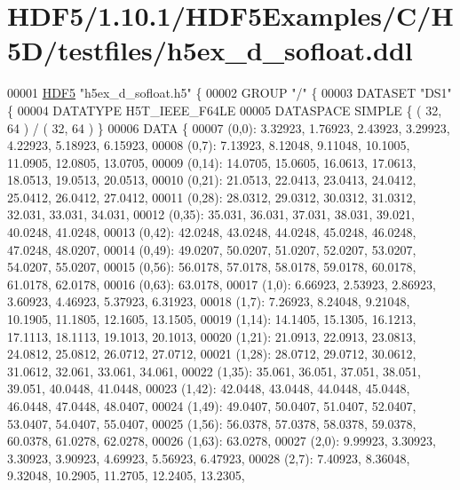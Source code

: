 \hypertarget{_h_d_f5_21_810_81_2_h_d_f5_examples_2_c_2_h5_d_2testfiles_2h5ex__d__sofloat_8ddl_source}{}\section{H\+D\+F5/1.10.1/\+H\+D\+F5\+Examples/\+C/\+H5\+D/testfiles/h5ex\+\_\+d\+\_\+sofloat.ddl}
\label{_h_d_f5_21_810_81_2_h_d_f5_examples_2_c_2_h5_d_2testfiles_2h5ex__d__sofloat_8ddl_source}

\begin{DoxyCode}
00001 \hyperlink{namespace_h_d_f5}{HDF5} \textcolor{stringliteral}{"h5ex\_d\_sofloat.h5"} \{
00002 GROUP \textcolor{stringliteral}{"/"} \{
00003    DATASET \textcolor{stringliteral}{"DS1"} \{
00004       DATATYPE  H5T\_IEEE\_F64LE
00005       DATASPACE  SIMPLE \{ ( 32, 64 ) / ( 32, 64 ) \}
00006       DATA \{
00007       (0,0): 3.32923, 1.76923, 2.43923, 3.29923, 4.22923, 5.18923, 6.15923,
00008       (0,7): 7.13923, 8.12048, 9.11048, 10.1005, 11.0905, 12.0805, 13.0705,
00009       (0,14): 14.0705, 15.0605, 16.0613, 17.0613, 18.0513, 19.0513, 20.0513,
00010       (0,21): 21.0513, 22.0413, 23.0413, 24.0412, 25.0412, 26.0412, 27.0412,
00011       (0,28): 28.0312, 29.0312, 30.0312, 31.0312, 32.031, 33.031, 34.031,
00012       (0,35): 35.031, 36.031, 37.031, 38.031, 39.021, 40.0248, 41.0248,
00013       (0,42): 42.0248, 43.0248, 44.0248, 45.0248, 46.0248, 47.0248, 48.0207,
00014       (0,49): 49.0207, 50.0207, 51.0207, 52.0207, 53.0207, 54.0207, 55.0207,
00015       (0,56): 56.0178, 57.0178, 58.0178, 59.0178, 60.0178, 61.0178, 62.0178,
00016       (0,63): 63.0178,
00017       (1,0): 6.66923, 2.53923, 2.86923, 3.60923, 4.46923, 5.37923, 6.31923,
00018       (1,7): 7.26923, 8.24048, 9.21048, 10.1905, 11.1805, 12.1605, 13.1505,
00019       (1,14): 14.1405, 15.1305, 16.1213, 17.1113, 18.1113, 19.1013, 20.1013,
00020       (1,21): 21.0913, 22.0913, 23.0813, 24.0812, 25.0812, 26.0712, 27.0712,
00021       (1,28): 28.0712, 29.0712, 30.0612, 31.0612, 32.061, 33.061, 34.061,
00022       (1,35): 35.061, 36.051, 37.051, 38.051, 39.051, 40.0448, 41.0448,
00023       (1,42): 42.0448, 43.0448, 44.0448, 45.0448, 46.0448, 47.0448, 48.0407,
00024       (1,49): 49.0407, 50.0407, 51.0407, 52.0407, 53.0407, 54.0407, 55.0407,
00025       (1,56): 56.0378, 57.0378, 58.0378, 59.0378, 60.0378, 61.0278, 62.0278,
00026       (1,63): 63.0278,
00027       (2,0): 9.99923, 3.30923, 3.30923, 3.90923, 4.69923, 5.56923, 6.47923,
00028       (2,7): 7.40923, 8.36048, 9.32048, 10.2905, 11.2705, 12.2405, 13.2305,

\end{DoxyCode}
